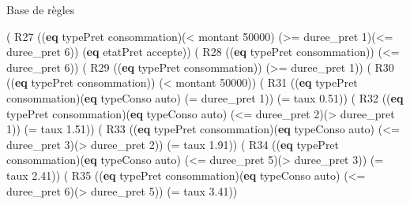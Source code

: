 \documentclass[
  ignorenonframetext,
]{beamer}
\newenvironment{Shaded}{}{}
\newcommand{\DecValTok}[1]{\textcolor[rgb]{0.25,0.63,0.44}{#1}}
\newcommand{\FloatTok}[1]{\textcolor[rgb]{0.25,0.63,0.44}{#1}}
\newcommand{\KeywordTok}[1]{\textcolor[rgb]{0.00,0.44,0.13}{\textbf{#1}}}
\newcommand{\NormalTok}[1]{#1}
\newcommand{\OperatorTok}[1]{\textcolor[rgb]{0.40,0.40,0.40}{#1}}
\begin{document}
\begin{frame}[fragile]{Base de règles}
\protect\hypertarget{base-de-ruxe8gles-3}{}
\begin{Shaded}
\begin{Highlighting}[]
\NormalTok{( R27 ((}\KeywordTok{eq}\NormalTok{ typePret consommation)(}\OperatorTok{\textless{}}\NormalTok{ montant }\DecValTok{50000}\NormalTok{)}
\NormalTok{    (}\OperatorTok{\textgreater{}=}\NormalTok{ duree\_pret }\DecValTok{1}\NormalTok{)(}\OperatorTok{\textless{}=}\NormalTok{ duree\_pret }\DecValTok{6}\NormalTok{))}
\NormalTok{     (}\KeywordTok{eq}\NormalTok{ etatPret accepte))}
\NormalTok{( R28 ((}\KeywordTok{eq}\NormalTok{ typePret consommation)) (}\OperatorTok{\textless{}=}\NormalTok{ duree\_pret }\DecValTok{6}\NormalTok{))}
\NormalTok{( R29 ((}\KeywordTok{eq}\NormalTok{ typePret consommation)) (}\OperatorTok{\textgreater{}=}\NormalTok{ duree\_pret }\DecValTok{1}\NormalTok{))}
\NormalTok{( R30 ((}\KeywordTok{eq}\NormalTok{ typePret consommation)) (}\OperatorTok{\textless{}}\NormalTok{ montant }\DecValTok{50000}\NormalTok{))}
\NormalTok{( R31 ((}\KeywordTok{eq}\NormalTok{ typePret consommation)(}\KeywordTok{eq}\NormalTok{ typeConso auto)}
\NormalTok{        (}\OperatorTok{=}\NormalTok{ duree\_pret }\DecValTok{1}\NormalTok{)) (}\OperatorTok{=}\NormalTok{ taux }\FloatTok{0.51}\NormalTok{))}
\NormalTok{( R32 ((}\KeywordTok{eq}\NormalTok{ typePret consommation)(}\KeywordTok{eq}\NormalTok{ typeConso auto)}
\NormalTok{        (}\OperatorTok{\textless{}=}\NormalTok{ duree\_pret }\DecValTok{2}\NormalTok{)(}\OperatorTok{\textgreater{}}\NormalTok{ duree\_pret }\DecValTok{1}\NormalTok{)) (}\OperatorTok{=}\NormalTok{ taux }\FloatTok{1.51}\NormalTok{))}
\NormalTok{( R33 ((}\KeywordTok{eq}\NormalTok{ typePret consommation)(}\KeywordTok{eq}\NormalTok{ typeConso auto)}
\NormalTok{        (}\OperatorTok{\textless{}=}\NormalTok{ duree\_pret }\DecValTok{3}\NormalTok{)(}\OperatorTok{\textgreater{}}\NormalTok{ duree\_pret }\DecValTok{2}\NormalTok{)) (}\OperatorTok{=}\NormalTok{ taux }\FloatTok{1.91}\NormalTok{))}
\NormalTok{( R34 ((}\KeywordTok{eq}\NormalTok{ typePret consommation)(}\KeywordTok{eq}\NormalTok{ typeConso auto)}
\NormalTok{        (}\OperatorTok{\textless{}=}\NormalTok{ duree\_pret }\DecValTok{5}\NormalTok{)(}\OperatorTok{\textgreater{}}\NormalTok{ duree\_pret }\DecValTok{3}\NormalTok{)) (}\OperatorTok{=}\NormalTok{ taux }\FloatTok{2.41}\NormalTok{))}
\NormalTok{( R35 ((}\KeywordTok{eq}\NormalTok{ typePret consommation)(}\KeywordTok{eq}\NormalTok{ typeConso auto)}
\NormalTok{        (}\OperatorTok{\textless{}=}\NormalTok{ duree\_pret }\DecValTok{6}\NormalTok{)(}\OperatorTok{\textgreater{}}\NormalTok{ duree\_pret }\DecValTok{5}\NormalTok{)) (}\OperatorTok{=}\NormalTok{ taux }\FloatTok{3.41}\NormalTok{))}
\end{Highlighting}
\end{Shaded}
\end{frame}
\end{document}
